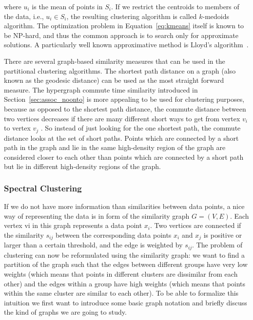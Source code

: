 where $u_i$ is the mean of points in $S_i$. If we restrict the centroids to members of the data, i.e., $u_i \in S_i$, the resulting clustering algorithm is called $k$-medoids algorithm. The optimization problem in Equation~\ref{eq:kmeans} itself is known to be NP-hard, and thus the common approach is to search only for approximate solutions. A particularly well known approximative method is Lloyd's algorithm~\cite{Lloyd83}.

There are several graph-based similarity measures that can be used in the partitional clustering algorithms. The shortest path distance on a graph (also known as the geodesic distance) can be used as the most straight forward measure.
The hypergraph commute time similarity introduced in Section~\ref{sec:assoc_noonto} is more appealing to be used for clustering purposes, because as opposed to the shortest path distance, the commute distance between two vertices decreases if there are many different short ways to get from vertex $v_i$ to vertex $v_j$ . So instead of just looking for the one shortest path, the commute distance looks at the set of short paths. Points which are connected by a short path in the graph and lie in the same high-density region of the graph are considered closer to each other than points which are connected by a short path but lie in different high-density regions of the graph.

\subsubsection{Spectral Clustering}
If we do not have more information than similarities between data points, a nice way of representing the data is in form of the similarity graph $G = (V,E)$. Each vertex vi in this graph represents a data point $x_i$. Two vertices are connected if the similarity $s_{ij}$ between the corresponding data points $x_i$ and $x_j$ is positive or larger than a certain threshold, and the edge is weighted by $s_{ij}$. The problem of clustering can now be reformulated using the similarity graph: we want to find a partition of the graph such that the edges between different groups have very low weights (which means that points in different clusters are dissimilar from each other) and the edges within a group have high weights (which means that points within the same cluster are similar to each other). To be able to formalize this intuition we first want to introduce some basic graph notation and briefly discuss the kind of graphs we are going to study.

